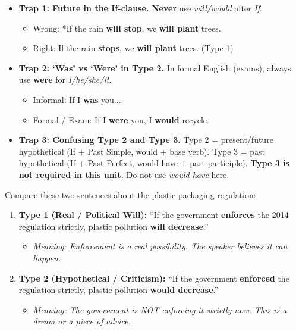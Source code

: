 \documentclass[11pt]{article}
\begin{document}
\begin{attention}
\begin{itemize}
    \item \textbf{Trap 1: Future in the If-clause.} \textbf{Never} use \emph{will/would} after \emph{If}.
    \begin{itemize}
        \item Wrong: *If the rain \textbf{will stop}, we \textbf{will plant} trees.
        \item Right: If the rain \textbf{stops}, we \textbf{will plant} trees. (Type 1)
    \end{itemize}
    \item \textbf{Trap 2: `Was' vs `Were' in Type 2.} In formal English (exams), always use \textbf{were} for \emph{I/he/she/it}.
    \begin{itemize}
        \item Informal: If I \textbf{was} you...
        \item Formal / Exam: If I \textbf{were} you, I \textbf{would} recycle.
    \end{itemize}
    \item \textbf{Trap 3: Confusing Type 2 and Type 3.} Type 2 = present/future hypothetical (If + Past Simple, would + base verb). Type 3 = past hypothetical (If + Past Perfect, would have + past participle). \textbf{Type 3 is not required in this unit.} Do not use \emph{would have} here.
\end{itemize}
\end{attention}

\begin{exemplebox}
Compare these two sentences about the plastic packaging regulation:
\begin{enumerate}
    \item \textbf{Type 1 (Real / Political Will):} ``If the government \textbf{enforces} the 2014 regulation strictly, plastic pollution \textbf{will decrease}.''
    \begin{itemize}
        \item \textit{Meaning: Enforcement is a real possibility. The speaker believes it can happen.}
    \end{itemize}
    \item \textbf{Type 2 (Hypothetical / Criticism):} ``If the government \textbf{enforced} the regulation strictly, plastic pollution \textbf{would decrease}.''
    \begin{itemize}
        \item \textit{Meaning: The government is NOT enforcing it strictly now. This is a dream or a piece of advice.}
    \end{itemize}
\end{enumerate}
\end{exemplebox}
\end{document}
